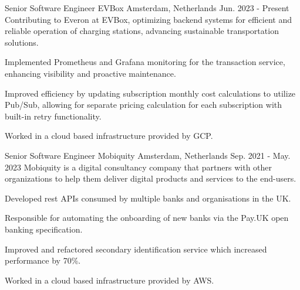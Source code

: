 

\begin{cventries}
  \cventry
  {Senior Software Engineer} %
  {EVBox} %
  {Amsterdam, Netherlands} %
  {Jun. 2023 - Present} %
  {
    Contributing to Everon at EVBox, optimizing backend systems for efficient and reliable operation of charging stations, advancing sustainable transportation solutions.
  }
  {
    \begin{cvitems} %
      \item {Implemented Prometheus and Grafana monitoring for the transaction service, enhancing visibility and proactive maintenance.}
      \item {Improved efficiency by updating subscription monthly cost calculations to utilize Pub/Sub, allowing for separate pricing calculation for each subscription with built-in retry functionality.}
      \item {Worked in a cloud based infrastructure provided by GCP.}
    \end{cvitems}
  }

  \cventry
    {Senior Software Engineer} %
    {Mobiquity} %
    {Amsterdam, Netherlands} %
    {Sep. 2021 - May. 2023} %
    {
      Mobiquity is a digital consultancy company that partners with other organizations to help them deliver digital products and services to the end-users.
    }
    {
      \begin{cvitems} %
        \item {Developed rest APIs consumed by multiple banks and organisations in the UK.}
        \item {Responsible for automating the onboarding of new banks via the Pay.UK open banking specification.}
        \item {Improved and refactored secondary identification service which increased performance by 70\%.}
        \item {Worked in a cloud based infrastructure provided by AWS.}
      \end{cvitems}
    }


\end{cventries}
